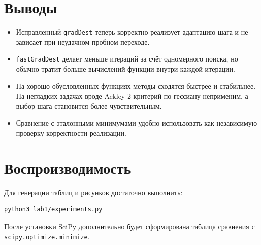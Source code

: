 \documentclass[12pt,a4paper]{article}
\begin{document}
\section{Выводы}
\begin{itemize}
\item Исправленный \texttt{gradDest} теперь корректно реализует адаптацию шага и не зависает при неудачном пробном переходе.
\item \texttt{fastGradDest} делает меньше итераций за счёт одномерного поиска, но обычно тратит больше вычислений функции внутри каждой итерации.
\item На хорошо обусловленных функциях методы сходятся быстрее и стабильнее. На негладких задачах вроде Ackley 2 критерий по гессиану неприменим, а выбор шага становится более чувствительным.
\item Сравнение с эталонными минимумами удобно использовать как независимую проверку корректности реализации.
\end{itemize}

\section*{Воспроизводимость}
Для генерации таблиц и рисунков достаточно выполнить:
\begin{verbatim}
python3 lab1/experiments.py
\end{verbatim}
После установки SciPy дополнительно будет сформирована таблица сравнения с \texttt{scipy.optimize.minimize}.
\end{document}
